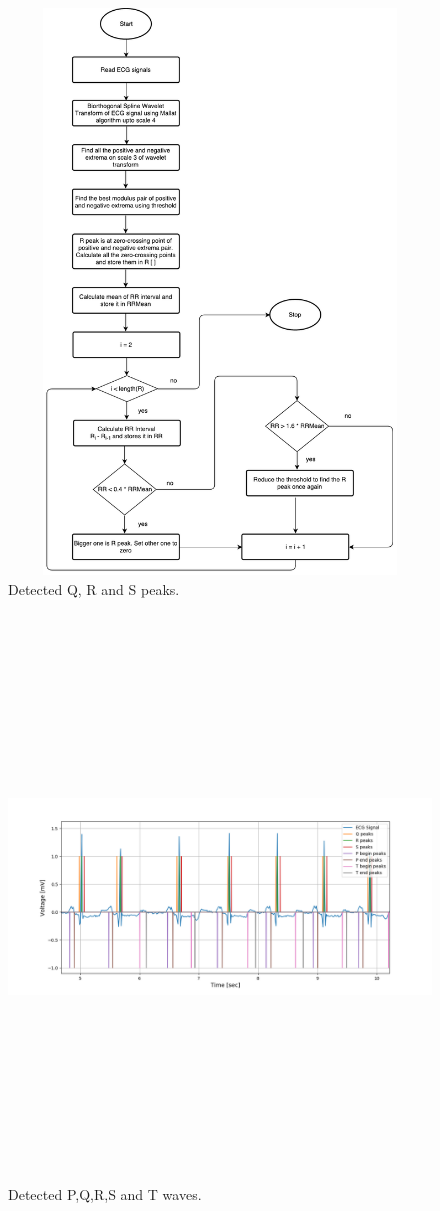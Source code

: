 \begin{figure}[htpb]
	\centering
	\includegraphics[width=15cm,height=15cm,keepaspectratio=true]{images/qrs}
	\caption{
		Detected Q, R and S peaks.
	}
	\label{fig:qrs_peaks}
\end{figure}


\begin{figure}[htpb]
	\centering
	\includegraphics[width=15cm,height=15cm,keepaspectratio=true]{images/pqrst}
	\caption{
		Detected P,Q,R,S and T waves.
	}
	\label{fig:pqrst}
\end{figure}



